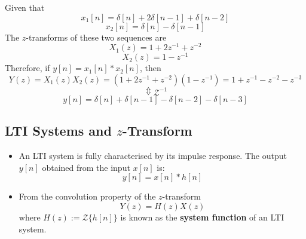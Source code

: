 \begin{ex}{}
Given that 
\[
x_1[n] = \delta[n] + 2\delta[n-1] + \delta[n-2]
\]
\[
x_2[n] = \delta[n] -\delta[n-1]
\]
The $z$-transforms of these two sequences are
\[
X_1(z) = 1 + 2z^{-1} +z^{-2}
\]
\[
X_2(z) = 1 - z^{-1}
\]
Therefore, if $y[n] = x_{1}[n] * x_{2}[n]$, then
\[
Y(z) = X_{1}(z)X_{2}(z) = (1 + 2z^{-1} +z^{-2})(1 - z^{-1}) = 1 + z^{-1} - z^{-2} - z^{-3}
\]
\[\Updownarrow\mathcal{Z}^{-1}\]
\[
y[n] = \delta[n] + \delta[n-1] - \delta[n-2] - \delta[n-3]
\]
\end{ex}


\subsection{LTI Systems and $z$-Transform}
\begin{itemize}
    \item An LTI system is fully characterised by its impulse response. The output $y[n]$ obtained from the input $x[n]$ is:
    \[
    y[n] = x[n] * h[n]
    \]

    \item From the convolution property of the $z$-transform
    \[
    Y(z) = H(z)X(z) 
    \]
    where $H(z) := \mathcal{Z}\{h[n]\}$ is known as the \textbf{system function} of an LTI system.
\end{itemize}


